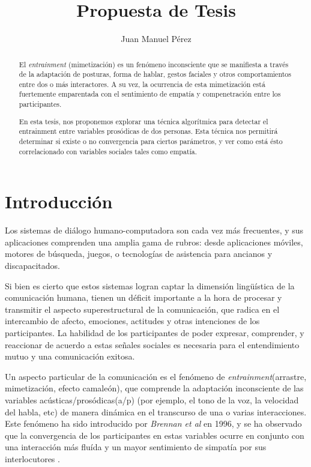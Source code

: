 \documentclass[a4paper,11pt]{article}
\title{Propuesta de Tesis}
\author{Juan Manuel Pérez}
\begin{document}
\maketitle

\begin{abstract}

El \emph{entrainment} (mimetización) es un fenómeno inconsciente que se manifiesta a través de la adaptación de posturas, forma de hablar, gestos faciales y otros comportamientos entre dos o más interactores. A su vez, la ocurrencia de esta mimetización está fuertemente emparentada con el sentimiento de empatía y compenetración entre los participantes.

En esta tesis, nos proponemos explorar una técnica algorítmica para detectar el entrainment entre variables prosódicas de dos personas. Esta técnica nos permitirá determinar si existe o no convergencia para ciertos parámetros, y ver como está ésto correlacionado con variables sociales tales como empatía.


\end{abstract}


\section*{Introducción}

Los sistemas de diálogo humano-computadora son cada vez más frecuentes, y sus aplicaciones comprenden una amplia gama de rubros: desde aplicaciones móviles, motores de búsqueda, juegos, o tecnologías de asistencia para ancianos y discapacitados.

Si bien es cierto que estos sistemas logran captar la dimensión lingüística de la comunicación humana, tienen un déficit importante a la hora de procesar y transmitir el aspecto superestructural de la comunicación, que radica en el intercambio de afecto, emociones, actitudes y otras intenciones de los participantes. La habilidad de los participantes de poder expresar, comprender, y reaccionar de acuerdo a estas señales sociales es necesaria para el entendimiento mutuo y una comunicación exitosa.

Un aspecto particular de la comunicación es el fenómeno de \emph{entrainment}(arrastre, mimetización, efecto camaleón), que comprende la adaptación inconsciente de las variables acústicas/prosódicas(a/p) (por ejemplo, el tono de la voz, la velocidad del habla, etc) de manera dinámica en el transcurso de una o varias interacciones. Este fenómeno ha sido introducido por \emph{Brennan et al}\cite{BRE1996} en 1996, y se ha observado que la convergencia de los participantes en estas variables ocurre en conjunto con una interacción más fluída y un mayor sentimiento de simpatía por sus interlocutores \cite{CHAR1999}.
\end{document}
